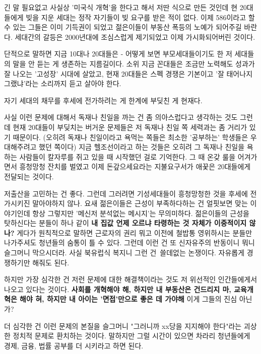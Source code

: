 \vspace{5mm}

긴 말 필요없고 사실상 '미국식 개혁'을 한다고 해서 저딴 식으로 만든 것인데
현 20대들에게 빚을 지운 세대는 정작 자기들이 빚 요구를 받은 적이 없다.
이제 586이라고 할 수 있는 그들은 이미 기득권이 되었고 젊은이들이 부동산 폭등의 노예가 되어주길 바란다.
세대간의 갈등은 2000년대에 조심스럽게 제기되었고 이제 가시화되어버린 것이다.
\vspace{5mm}

단적으로 말하면 지금 10대나 20대들은 - 어떻게 보면 부모세대들이기도 한 저 세대들의 말을 안 듣는 게 생존하는 지름길이다.
소위 지금 꼰대들은 조금만 노력해도 성과가 잘 나오는 '고성장' 시대에 살았고,
현재 20대들은 스펙 경쟁은 기본이고 '잘 태어나지 그랬냐'라는 소리까지 듣고 살아야 한다.
\vspace{5mm}

자기 세대의 채무를 후세에 전가하려는 게 한계에 부딪친 게 현재다.
\vspace{5mm}

사실 이런 문제에 대해서 독재나 친일을 까는 건 좀 의아스럽다고 생각하는 것도 그런데
현재 20대들이 부딪치는 버거운 문제들은 저 독재나 친일 쪽 세력과는 좀 거리가 있기 때문이다.
(오히려 독재나 친일이라고 욕먹는 쪽들은 최소한 '공부하는' 학생들은 우대해주려고 했던 쪽이다)
지금 헬조선이라고 하는 것들은 오히려 그 독재나 친일을 욕하는 사람들이 칼자루를 쥐고 있을 때 시작했던 걸로 기억한다.
그 때 온갖 룰을 어겨가면서 흥청망청 잔치를 벌였고 이제 돈갚으세요라는 지불요구서가 애꿎은 20대들에게 전달되는 것이다.
\vspace{5mm}

저출산을 고민하는 건 좋다. 그런데 그러려면 기성세대들이 흥청망청한 것을 후세에 전가시키진 말아야하지 않나.
요새 젊은이들은 근성이 부족하다하는 건 얼핏보면 맞는 이야기인데 항상 그렇지만 '메신저 분석없는 메시지'는 무의미하다.
젊은이들의 근성을 탓하신다는 분들이 하나 같이 \textbf{내 집값 언제 오르냐 타령하는 것 자체가 이중적이지 않나?}
게다가 원칙적으로 말하면 근로자의 권리 뭐고 이전에 철밥통 영위하시는 분들만 나가주셔도
청년들의 숨통이 틀 수 있다. 그런데 이런 건 또 신자유주의 반동이니 뭐니 슬그머니 막으시더라.
사실 북유럽식 복지니 그런 건 쓸데없는 논쟁이다. 자유롭게 경쟁하기만 해줘도 된다.
\vspace{5mm}

하지만 가장 심각한 건 저런 문제에 대한 해결책이라는 것도 저 위선적인 인간들에게서 나오고 있다는 것이다.
\textbf{사회를 개혁해야 해, 하지만 내 부동산은 건드리지 마, 교육개혁은 해야 혀, 하지만 내 아이는 '면접'만으로 좋은 데 가야해}
이게 그들의 진심 아닌가?
\vspace{5mm}

더 심각한 건 이런 문제의 본질을 슬그머니 "그러니까 xx당을 지지해야 한다"라는 괴상한 정치적 문제로 환치하는 것이다.
말하지만 그럴 시간이 있으면 차라리 청년들에게 경제, 금융, 법률 공부를 더 시키라고 하면 된다.
\vspace{5mm}





